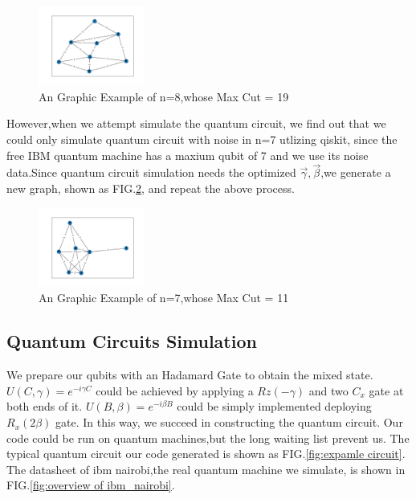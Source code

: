 \begin{figure}[!htb]
    \centering
    \includegraphics[width=0.309\textwidth]{graphic_n=8.png}
    \caption{An Graphic Example of n=8,whose Max Cut = 19}
    \label{fig:n=8}
\end{figure}

However,when we attempt simulate the quantum circuit, we find out that we could only simulate quantum circuit with noise in n=7 utlizing qiskit, since the free IBM quantum machine has a maxium qubit of 7 and we use its noise data.Since quantum circuit simulation needs the optimized $\vec{\gamma},\vec{\beta}$,we generate a new graph, shown as FIG.\ref{fig:n=7}, and repeat the above process.

\begin{figure}[!htb]
    \centering
    \includegraphics[width=0.309\textwidth]{graphic_n=7.png}
    \caption{An Graphic Example of n=7,whose Max Cut = 11}
    \label{fig:n=7}
\end{figure}

\clearpage

\subsection{Quantum Circuits Simulation}

We prepare our qubits with an Hadamard Gate to obtain the mixed state. $U(C, \gamma)=e^{-i\gamma C}$ could be achieved by applying a $Rz(-\gamma)$ and two $C_x$ gate at  both ends of it.  $U(B, \beta)=e^{-i\beta B}$ could be simply implemented deploying $R_x(2\beta)$ gate. In this way, we succeed in constructing the quantum circuit. Our code could be run on quantum machines,but the long waiting list prevent us. The typical quantum circuit our code generated is shown as FIG.\ref{fig:expamle circuit}. The datasheet of ibm nairobi,the real quantum machine we simulate, is shown in FIG.\ref{fig:overview of ibm_nairobi}.

